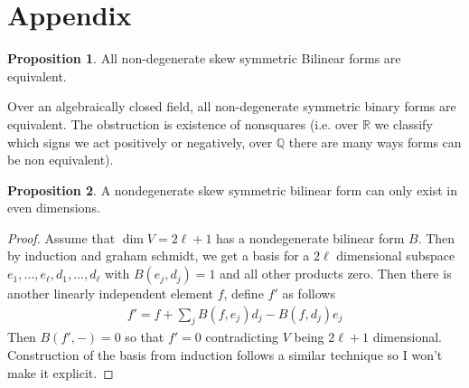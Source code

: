 \documentclass[10.5pt]{article}
\theoremstyle{definition}
\newtheorem{proposition}{Proposition}
\numberwithin{example}{subsection}
\numberwithin{proposition}{subsection}
\numberwithin{pb}{subsection}
\begin{document}
        \section{Appendix}
        \begin{proposition}\label{bilinearformequiv}
            All non-degenerate skew symmetric Bilinear forms are equivalent.

            Over an algebraically closed field, all non-degenerate symmetric binary forms are equivalent. The obstruction is existence of nonsquares (i.e. over \(\mathbb{R}\) we classify which signs we act positively or negatively, over \(\mathbb{Q}\) there are many ways forms can be non equivalent).
        \end{proposition}
        \begin{proposition}\label{nondegenskewsym}
            A nondegenerate skew symmetric bilinear form can only exist in even dimensions.

            \begin{proof}
                Assume that \(\dim V = 2\ell + 1\) has a nondegenerate bilinear form \(B\). Then by induction and graham schmidt, we get a basis for a \(2\ell\) dimensional subspace \(e_1,\hdots,e_\ell,d_1,\hdots,d_\ell\) with \(B(e_j,d_j) = 1\) and all other products zero. Then there is another linearly independent element \(f\), define \(f'\) as follows
                \begin{align}
                    f' = f + \sum_j B(f,e_j)d_j - B(f,d_j)e_j
                \end{align}
                Then \(B(f',-) = 0\) so that \(f' = 0\) contradicting \(V\) being \(2 \ell + 1\) dimensional. Construction of the basis from induction follows a similar technique so I won't make it explicit.
            \end{proof}
        \end{proposition}
\end{document}
